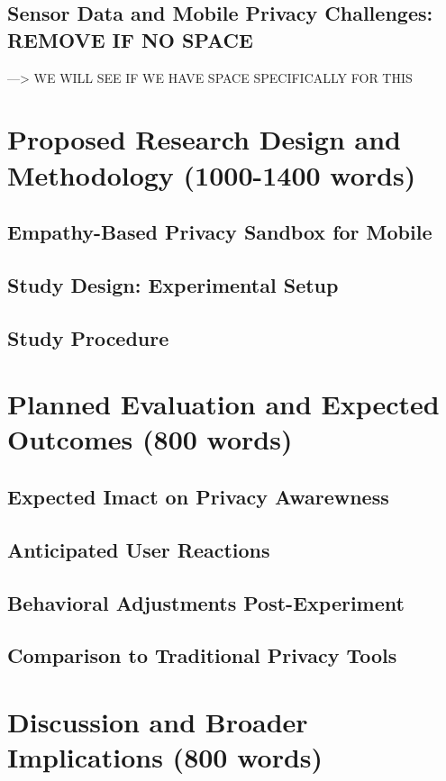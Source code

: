 \documentclass[acmlarge, nonacm]{acmart}
\begin{document}
\subsection{Sensor Data and Mobile Privacy Challenges: REMOVE IF NO SPACE}
 ---> WE WILL SEE IF WE HAVE SPACE SPECIFICALLY FOR THIS

\section{Proposed Research Design and Methodology (1000-1400 words)}

\subsection{Empathy-Based Privacy Sandbox for Mobile}

\subsection{Study Design: Experimental Setup}

\subsection{Study Procedure}

\section{Planned Evaluation and Expected Outcomes (800 words)}

\subsection{Expected Imact on Privacy Awarewness}

\subsection{Anticipated User Reactions}

\subsection{Behavioral Adjustments Post-Experiment}

\subsection{Comparison to Traditional Privacy Tools}

\section{Discussion and Broader Implications (800 words)}
\end{document}
